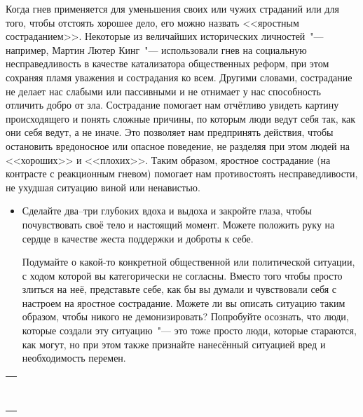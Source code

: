 Когда гнев применяется для уменьшения своих или чужих страданий или для того, чтобы отстоять хорошее дело, его можно назвать <<яростным состраданием>>. Некоторые из величайших исторических личностей~"--- например, Мартин Лютер Кинг~"--- использовали гнев на социальную несправедливость в качестве катализатора общественных реформ, при этом сохраняя пламя уважения и сострадания ко всем. Другими словами, сострадание не делает нас слабыми или пассивными и не отнимает у нас способность отличить добро от зла. Сострадание помогает нам отчётливо увидеть картину происходящего и понять сложные причины, по которым люди ведут себя так, как они себя ведут, а не иначе. Это позволяет нам предпринять действия, чтобы остановить вредоносное или опасное поведение, не разделяя при этом людей на <<хороших>> и <<плохих>>. Таким образом, яростное сострадание (на контрасте с реакционным гневом) помогает нам противостоять несправедливости, не ухудшая ситуацию виной или ненавистью.
\begin{itemize}
	\item Сделайте два--три глубоких вдоха и выдоха и закройте глаза, чтобы почувствовать своё тело и настоящий момент. Можете положить руку на сердце в качестве жеста поддержки и доброты к себе.
	
	\itemWritingHand Подумайте о какой-то конкретной общественной или политической ситуации, с ходом которой вы категорически не согласны. Вместо того чтобы просто злиться на неё, представьте себе, как бы вы думали и чувствовали себя с настроем на яростное сострадание. Можете ли вы описать ситуацию таким образом, чтобы никого не демонизировать? Попробуйте осознать, что люди, которые создали эту ситуацию~"--- это тоже просто люди, которые стараются, как могут, но при этом также признайте нанесённый ситуацией вред и необходимость перемен.
\end{itemize}
\setlength{\extrarowheight}{2mm}
\begin{tabularx}{\textwidth}{X}
	\\
	\arrayrulecolor{gray}\hline\\
	\hline\\
	\hline\\
	\hline\\
	\hline\\
	\hline\\	
	\hline\\
	\hline\\
	\hline\\
\end{tabularx}
\setlength{\extrarowheight}{0mm}
